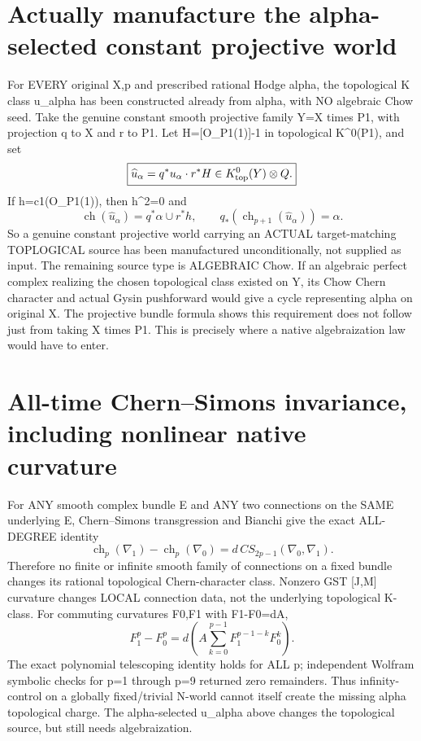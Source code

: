 \documentclass{article}
\begin{document}
\section{Actually manufacture the alpha-selected constant projective world}
For EVERY original X,p and prescribed rational Hodge alpha,
the topological K class u_alpha has been constructed already
from alpha, with NO algebraic Chow seed.
Take the genuine constant smooth projective family
Y=X times P1, with projection q to X and r to P1.
Let H=[O_P1(1)]-1 in topological K^0(P1), and set
\[
\boxed{\widehat u_\alpha=q^*u_\alpha\cdot r^*H
\in K_{\rm top}^0(Y)\otimes Q.}
\]
If h=c1(O_P1(1)), then h^2=0 and
\[
\boxed{\operatorname{ch}(\widehat u_\alpha)
=q^*\alpha\cup r^*h,\qquad
q_*(\operatorname{ch}_{p+1}(\widehat u_\alpha))=\alpha.}
\]
So a genuine constant projective world carrying an
ACTUAL target-matching TOPLOGICAL source has been
manufactured unconditionally, not supplied as input.
The remaining source type is ALGEBRAIC Chow.
If an algebraic perfect complex realizing
the chosen topological class existed on Y, its
Chow Chern character and actual Gysin pushforward
would give a cycle representing alpha on original X.
The projective bundle formula shows this requirement
does not follow just from taking X times P1.
This is precisely where a native algebraization law
would have to enter.

\section{All-time Chern--Simons invariance, including nonlinear native curvature}
For ANY smooth complex bundle E and ANY two connections
on the SAME underlying E, Chern--Simons transgression
and Bianchi give the exact ALL-DEGREE identity
\[
\boxed{\operatorname{ch}_p(\nabla_1)
-\operatorname{ch}_p(\nabla_0)
=d\,CS_{2p-1}(\nabla_0,\nabla_1).}
\]
Therefore no finite or infinite smooth family of
connections on a fixed bundle changes its rational
topological Chern-character class. Nonzero GST
[J,M] curvature changes LOCAL connection data,
not the underlying topological K-class.
For commuting curvatures F0,F1 with F1-F0=dA,
\[
F_1^p-F_0^p=d\left(A
\sum_{k=0}^{p-1}F_1^{p-1-k}F_0^k\right).
\]
The exact polynomial telescoping identity holds for
ALL p; independent Wolfram symbolic checks for
p=1 through p=9 returned zero remainders.
Thus infinity-control on a globally fixed/trivial
N-world cannot itself create the missing
alpha topological charge. The alpha-selected
u_alpha above changes the topological source,
but still needs algebraization.
\end{document}
